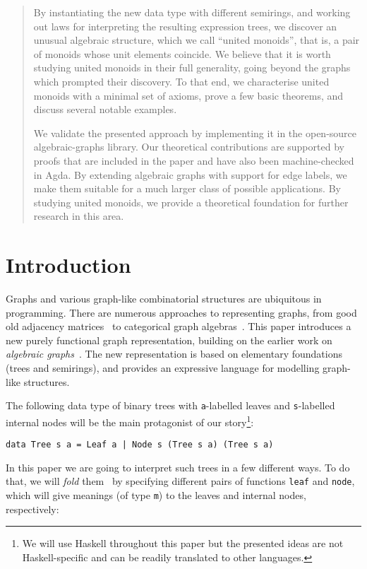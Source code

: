 \documentclass[crc,english]{programming}
\newcommand{\hcode}[1]{{\color{darkblue} \lstinline[keywordstyle={}]|#1|}} %
\begin{document}
\begin{abstract}
By instantiating the new data type with different semirings, and working out
laws for interpreting the resulting expression trees, we discover an unusual
algebraic structure, which we call ``united monoids'', that
is, a pair of monoids whose unit elements coincide. We believe that it is worth
studying united monoids in their full generality, going beyond the graphs which
prompted their discovery. To that end, we characterise united monoids with a
minimal set of axioms, prove a few basic theorems, and discuss several notable
examples.

We validate the presented approach by implementing it in the
open-source \textsf{algebraic-graphs} library. Our theoretical contributions
are supported by proofs that are included in the paper and have also
been machine-checked in Agda. By extending algebraic graphs with support for
edge labels, we make them suitable for a much larger class of possible
applications. By studying united monoids, we provide a theoretical foundation
for further research in this area.
\end{abstract}

\section{Introduction}
\vspace{-1mm}

Graphs and various graph-like combinatorial structures are ubiquitous in
programming. There are numerous approaches to representing graphs, from good old
adjacency matrices~\cite{cormen2009introduction} to categorical graph
algebras~\cite{2010_selinger_survey}. This paper introduces a new purely
functional graph representation, building on the earlier work on
\emph{algebraic graphs}~\cite{mokhov_alga}. The new representation is based on
elementary foundations (trees and semirings), and provides an expressive
language for modelling graph-like structures.

The following data type of binary trees with \hcode{a}-labelled leaves and
\hcode{s}-labelled internal nodes will be the main protagonist of our
story\footnote{
    We will use Haskell throughout this paper but the presented ideas
    are not Haskell-specific and can be readily translated to other languages.
}:

\begin{lstlisting}
data Tree s a = Leaf a | Node s (Tree s a) (Tree s a)
\end{lstlisting}

\noindent
In this paper we are going to interpret such trees in a few different ways. To
do that, we will \emph{fold} them~\cite{gibbons_folds} by specifying different
pairs of functions \hcode{leaf} and \hcode{node}, which will give meanings (of
type \hcode{m}) to the leaves and internal nodes, respectively:
\end{document}
